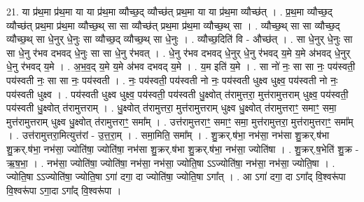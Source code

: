 \documentclass[17pt]{extarticle}
\begin{document}
21. या प्र॑थ॒मा प्र॑थ॒मा या या प्र॑थ॒मा व्यौच्छ॒द् व्यौच्छ॑त् प्रथ॒मा या या प्र॑थ॒मा व्यौच्छ॑त् । . प्र॒थ॒मा व्यौच्छ॒द् व्यौच्छ॑त् प्रथ॒मा प्र॑थ॒मा व्यौच्छ॒थ् सा सा व्यौच्छ॑त् प्रथ॒मा प्र॑थ॒मा व्यौच्छ॒थ् सा । . व्यौच्छ॒थ् सा सा व्यौच्छ॒द् व्यौच्छ॒थ् सा धे॒नुर् धे॒नुः सा व्यौच्छ॒द् व्यौच्छ॒थ् सा धे॒नुः । . व्यौच्छ॒दिति॑ वि - औच्छ॑त् । . सा धे॒नुर् धे॒नुः सा सा धे॒नु र॑भव दभवद् धे॒नुः सा सा धे॒नु र॑भवत् । . धे॒नु र॑भव दभवद् धे॒नुर् धे॒नु र॑भवद् य॒मे य॒मे अ॑भवद् धे॒नुर् धे॒नु र॑भवद् य॒मे । . अ॒भ॒व॒द् य॒मे य॒मे अ॑भव दभवद् य॒मे । . य॒म इति॑ य॒मे । . सा नो॑ नः॒ सा सा नः॒ पय॑स्वती॒ पय॑स्वती नः॒ सा सा नः॒ पय॑स्वती । . नः॒ पय॑स्वती॒ पय॑स्वती नो नः॒ पय॑स्वती धुक्ष्व धुक्ष्व॒ पय॑स्वती नो नः॒ पय॑स्वती धुक्ष्व । . पय॑स्वती धुक्ष्व धुक्ष्व॒ पय॑स्वती॒ पय॑स्वती धु॒क्ष्वोत् त॑रामुत्तरा॒ मुत्त॑रामुत्तराम् धुक्ष्व॒ पय॑स्वती॒ पय॑स्वती धु॒क्ष्वोत् त॑रामुत्तराम् । . धु॒क्ष्वोत् त॑रामुत्तरा॒ मुत्त॑रामुत्तराम् धुक्ष्व धु॒क्ष्वोत् त॑रामुत्तराꣳ॒॒ समाꣳ॒॒ समा॒ मुत्त॑रामुत्तराम् धुक्ष्व धु॒क्ष्वोत् त॑रामुत्तराꣳ॒॒ समा᳚म् । . उत्त॑रामुत्तराꣳ॒॒ समाꣳ॒॒ समा॒ मुत्त॑रामुत्तरा॒ मुत्त॑रामुत्तराꣳ॒॒ समा᳚म् । . उत्त॑रामुत्तरा॒मित्युत्त॑रां - उ॒त्त॒रा॒म् । . समा॒मिति॒ समा᳚म् । . शु॒क्रर्.ष॑भा॒ नभ॑सा॒ नभ॑सा शु॒क्रर्.ष॑भा शु॒क्रर्.ष॑भा॒ नभ॑सा॒ ज्योति॑षा॒ ज्योति॑षा॒ नभ॑सा शु॒क्रर्.ष॑भा शु॒क्रर्.ष॑भा॒ नभ॑सा॒ ज्योति॑षा । . शु॒क्रर्.ष॒भेति॑ शु॒क्र - ऋ॒ष॒भा॒ । . नभ॑सा॒ ज्योति॑षा॒ ज्योति॑षा॒ नभ॑सा॒ नभ॑सा॒ ज्योति॒षा ऽऽज्योति॑षा॒ नभ॑सा॒ नभ॑सा॒ ज्योति॒षा । . ज्योति॒षा ऽऽज्योति॑षा॒ ज्योति॒षा ऽगा॑ दगा॒ दा ज्योति॑षा॒ ज्योति॒षा ऽगा᳚त् । . आ ऽगा॑ दगा॒ दा ऽगा᳚द् वि॒श्वरू॑पा वि॒श्वरू॑पा ऽगा॒दा ऽगा᳚द् वि॒श्वरू॑पा । \newline
\end{document}
